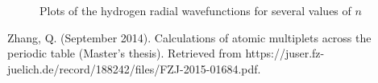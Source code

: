 \documentclass[12pt]{article}
\begin{document}
\begin{figure}
    \caption{Plots of the hydrogen radial wavefunctions for several values of $n$}\label{results}
\end{figure}

\begin{thebibliography}{9}%
 Zhang, Q. (September 2014). Calculations of atomic multiplets across the periodic table (Master’s thesis). Retrieved from https://juser.fz-juelich.de/record/188242/files/FZJ-2015-01684.pdf.
\end{thebibliography}
\end{document}
